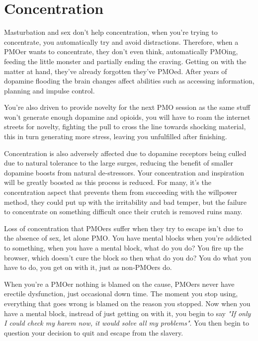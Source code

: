 \documentclass[easypeasy.tex]{subfiles}
\begin{document}
\section{Concentration}

Masturbation and sex don't help concentration, when you're trying to concentrate, you automatically try and avoid distractions. Therefore, when a PMOer wants to concentrate, they don't even think, automatically PMOing, feeding the little monster and partially ending the craving. Getting on with the matter at hand, they've already forgotten they've PMOed. After years of dopamine flooding the brain changes affect abilities such as accessing information, planning and impulse control.

You're also driven to provide novelty for the next PMO session as the same stuff won't generate enough dopamine and opioids, you will have to roam the internet streets for novelty, fighting the pull to cross the line towards shocking material, this in turn generating more stress, leaving you unfulfilled after finishing.

Concentration is also adversely affected due to dopamine receptors being culled due to natural tolerance to the large surges, reducing the benefit of smaller dopamine boosts from natural de-stressors. Your concentration and inspiration will be greatly boosted as this process is reduced. For many, it's the concentration aspect that prevents them from succeeding with the willpower method, they could put up with the irritability and bad temper, but the failure to concentrate on something difficult once their crutch is removed ruins many.

Loss of concentration that PMOers suffer when they try to escape isn't due to the absence of sex, let alone PMO. You have mental blocks when you're addicted to something, when you have a mental block, what do you do? You fire up the browser, which doesn't cure the block so then what do you do? You do what you have to do, you get on with it, just as non-PMOers do.

When you're a PMOer nothing is blamed on the cause, PMOers never have erectile dysfunction, just occasional down time. The moment you stop using, everything that goes wrong is blamed on the reason you stopped. Now when you have a mental block, instread of just getting on with it, you begin to say \textit{"If only I could check my harem now, it would solve all my problems"}. You then begin to question your decision to quit and escape from the slavery.
\end{document}
